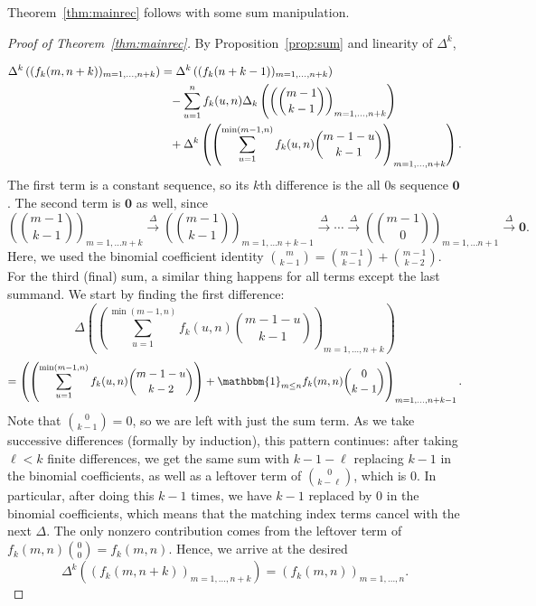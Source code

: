 \documentclass{amsart}
\theoremstyle{definition}
\begin{document}
Theorem~\ref{thm:mainrec} follows with some sum manipulation.
\begin{proof}[Proof of Theorem~\ref{thm:mainrec}]
By Proposition~\ref{prop:sum} and linearity of $\Delta^k$, 

\begin{align*}
    \Delta^k\left((f_k(m,n+k))_{m=1,\ldots,n+k}\right)&=\Delta^k\left((f_k(n+k-1))_{m=1,\ldots,n+k}\right)\\
    &\hphantom{=}-\sum_{u=1}^{n}f_k(u,n)\Delta_k\left(\left(\binom{m-1}{k-1}\right)_{m=1,\ldots,n+k}\right)\\
    &\hphantom{=}+\Delta^k\left(\left(\sum_{u=1}^{\min(m-1,n)}f_k(u,n)\binom{m-1-u}{k-1}\right)_{m=1,\ldots,n+k}\right).
\end{align*}
The first term is a constant sequence, so its $k$th difference is the all $0$s sequence $\mathbf{0}$. The second term is $\mathbf{0}$ as well, since \[\left(\binom{m-1}{k-1}\right)_{m=1,\ldots n+k}\xrightarrow{\Delta}\left(\binom{m-1}{k-1}\right)_{m=1,\ldots n+k-1}\xrightarrow{\Delta}\cdots \xrightarrow{\Delta}\left(\binom{m-1}{0}\right)_{m=1,\ldots n+1}\xrightarrow{\Delta} \mathbf{0}.\]
Here, we used the binomial coefficient identity $\binom{m}{k-1}=\binom{m-1}{k-1}+\binom{m-1}{k-2}$. For the third (final) sum, a similar thing happens for all terms except the last summand. We start by finding the first difference:
\[\Delta\left(\left(\sum_{u=1}^{\min(m-1,n)}f_k(u,n)\binom{m-1-u}{k-1}\right)_{m=1,\ldots,n+k}\right)\]\[=\left(\left(\sum_{u=1}^{\min(m-1,n)}f_k(u,n)\binom{m-1-u}{k-2}\right)+\mathbbm{1}_{m\leq n}f_k(m,n)\binom{0}{k-1}\right)_{m=1,\ldots,n+k-1}.\]
Note that $\binom{0}{k-1}=0$, so we are left with just the sum term. As we take successive differences (formally by induction), this pattern continues: after taking $\ell<k$ finite differences, we get the same sum with $k-1-\ell$ replacing $k-1$ in the binomial coefficients, as well as a leftover term of $\binom{0}{k-\ell}$, which is $0$. In particular, after doing this $k-1$ times, we have $k-1$ replaced by $0$ in the binomial coefficients, which means that the matching index terms cancel with the next $\Delta$. The only nonzero contribution comes from the leftover term of $f_k(m,n)\binom{0}{0}=f_k(m,n)$. Hence, we arrive at the desired
\[\Delta^k\left((f_k(m,n+k))_{m=1,\ldots,n+k}\right)=\left(f_k(m,n)\right)_{m=1,\ldots,n}.\]
\end{proof}
\end{document}
